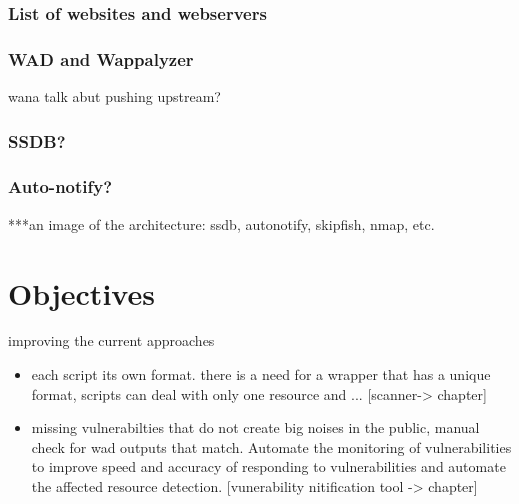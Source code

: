 \subsubsection{List of websites and webservers}
\subsubsection{WAD and Wappalyzer}
wana talk abut pushing upstream?
\subsubsection{SSDB?}
\subsubsection{Auto-notify?}

***an image of the architecture: ssdb, autonotify, skipfish, nmap, etc.


\section{Objectives}
improving the current approaches
\begin{itemize}
\item each script its own format. there is a need for a wrapper that has a unique format, scripts can deal with only one resource and ... [scanner-> chapter]
\item missing vulnerabilties that do not create big noises in the public, manual check for wad outputs that match. Automate the monitoring of vulnerabilities to improve speed and accuracy of responding to vulnerabilities and automate the affected resource detection. [vunerability nitification tool -> chapter]
\end{itemize}

























